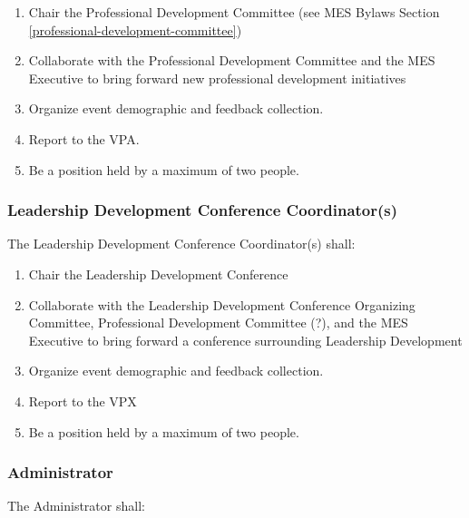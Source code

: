 \begin{enumerate}
 \item
  Chair the Professional Development Committee (see MES Bylaws Section \ref{professional-development-committee})
 \item
  Collaborate with the Professional Development Committee and the MES Executive to bring forward new professional development initiatives
 \item
  Organize event demographic and feedback collection.
 \item
  Report to the VPA.
 \item
  Be a position held by a maximum of two people.

\end{enumerate}

\subsubsection{Leadership Development Conference Coordinator(s)}
\label{leadership-development-conference-coordinators}
The Leadership Development Conference Coordinator(s) shall:

\begin{enumerate}
 \item
  Chair the Leadership Development Conference
 \item
  Collaborate with the Leadership Development Conference Organizing Committee, Professional Development Committee (?), and the MES Executive to bring forward a conference surrounding Leadership Development
 \item
  Organize event demographic and feedback collection.
 \item
  Report to the VPX
 \item
  Be a position held by a maximum of two people.
\end{enumerate}

\subsubsection{Administrator}
\label{administrator}
The Administrator shall:

